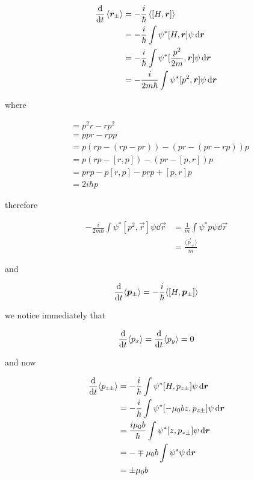 \begin{align}
	\diff*{\left\langle\vec r_\pm\right\rangle}{t} &= -\frac{i}{\hbar}\left\langle[H,\vec r]\right\rangle\\
	&= -\frac{i}{\hbar} \int\psi^*[H,\vec r]\psi\dd \vec r\\
	&= -\frac{i}{\hbar} \int\psi^*[\frac{p^2}{2m},\vec r]\psi\dd \vec r\\
	&= -\frac{i}{2m\hbar} \int\psi^*[p^2,\vec r]\psi\dd \vec r
\end{align}

where

\begin{align}
	[p^2,r] &= p^2r-rp^2\\
	&= ppr-rpp\\
	&= p(rp-(rp-pr))-(pr-(pr-rp))p\\
	&= p(rp-[r,p])-(pr-[p,r])p\\
	&= prp-p[r,p]-prp+[p,r]p\\
	&= 2i\hbar p
\end{align}

therefore

\begin{align}
	-\frac{i}{2m\hbar} \int\psi^*[p^2,\vec r]\psi\dd \vec r &= \frac{1}{m}\int\psi^*p\psi\dd \vec r\\
	&= \frac{\langle \vec p_\pm\rangle}{m}
\end{align}

and

\begin{align}
	\diff*{\langle\vec p_\pm\rangle}{t} &= -\frac{i}{\hbar}\langle[H,\vec p_\pm]\rangle\\
\end{align}

we notice immediately that 

\begin{align}
	\diff*{\langle p_x\rangle}{t} = \diff*{\langle p_y\rangle}{t} = 0
\end{align}

and now

\begin{align}
	\diff*{\langle p_{z\pm}\rangle}{t} &= -\frac{i}{\hbar}\int\psi^*[H,p_{z\pm}]\psi\dd\vec r\\
	&= -\frac{i}{\hbar}\int\psi^*[-\mu_0bz,p_{z\pm}]\psi\dd\vec r\\
	&= \frac{i\mu_0b}{\hbar}\int\psi^*[z,p_{z\pm}]\psi\dd \vec r\\
	&= -\mp\mu_0b\int \psi^*\psi\dd \vec r\\
	&= \pm\mu_0b
\end{align}

